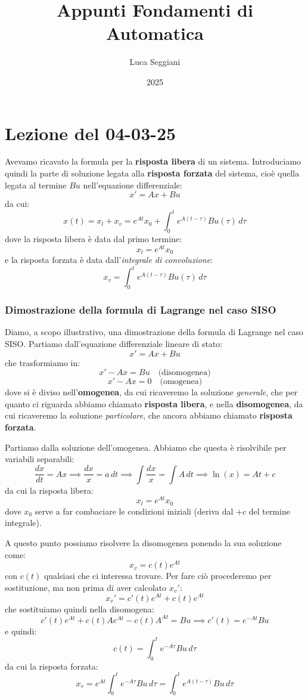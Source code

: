 \documentclass[a4paper,11pt]{article}
\title{Appunti Fondamenti di Automatica}
\author{Luca Seggiani}
\date{2025}
\begin{document}
\section{Lezione del 04-03-25}

\thispagestyle{empty}
\pagestyle{fancy}

Avevamo ricavato la formula per la \textbf{risposta libera} di un sistema.
Introduciamo quindi la parte di soluzione legata alla \textbf{risposta forzata} del sistema, cioè quella legata al termine $Bu$ nell'equazione differenziale:
$$
x' = Ax + Bu
$$
da cui:
$$
x(t) = x_l + x_v = e^{At} x_0 + \int_0^t e^{A(t - \tau)} Bu(\tau) \, d\tau
$$
dove la risposta libera è data dal primo termine:
$$
x_l = e^{At} x_0 
$$
e la risposta forzata è data dall'\textit{integrale di convoluzione}:
$$
x_v = \int_0^t e^{A(t - \tau)} Bu(\tau) \, d\tau
$$

\subsubsection{Dimostrazione della formula di Lagrange nel caso SISO}
Diamo, a scopo illustrativo, una dimostrazione della formula di Lagrange nel caso SISO.
Partiamo dall'equazione differenziale lineare di stato:
$$
x' = Ax + Bu
$$
che trasformiamo in:
$$
x' - Ax = Bu \quad \text{(disomogenea)}
$$
$$
x' - Ax = 0 \quad \text{(omogenea)}
$$
dove si è diviso nell'\textbf{omogenea}, da cui ricaveremo la soluzione \textit{generale}, che per quanto ci riguarda abbiamo chiamato \textbf{risposta libera}, e nella \textbf{disomogenea}, da cui ricaveremo la soluzione \textit{particolare}, che ancora abbiamo chiamato \textbf{risposta forzata}.

Partiamo dalla soluzione dell'omogenea.
Abbiamo che questa è risolvibile per variabili separabili:
$$
\frac{dx}{dt} = Ax \implies \frac{dx}{x} = a \, dt \implies \int \frac{dx}{x} = \int A \, dt \implies \ln(x) = At + c
$$
da cui la risposta libera:
$$
x_l = e^{At} x_0
$$
dove $x_0$ serve a far combaciare le condizioni iniziali (deriva dal $+ c$ del termine integrale).

A questo punto possiamo risolvere la disomogenea ponendo la sua soluzione come:
$$
x_v = c(t) e^{At}
$$
con $c(t)$ qualsiasi che ci interessa trovare.
Per fare ciò procederemo per sostituzione, ma non prima di aver calcolato $x_v'$:
$$
x_v' = c'(t) e^{At} + c(t) e^{At}
$$
che sostituiamo quindi nella disomogena:
$$
c'(t) e^{At} + c(t) A e^{At} - c(t) A^{At} = Bu \implies c'(t) = e^{-At} Bu 
$$
e quindi:
$$
c(t) = \int_0^t e^{-A \tau} Bu \, d\tau
$$
da cui la risposta forzata:
$$
x_v = e^{At} \int_0^t e^{-A\tau} Bu \, d \tau = \int_0^t e^{A(t - \tau)} B u \, d \tau
$$
\end{document}
